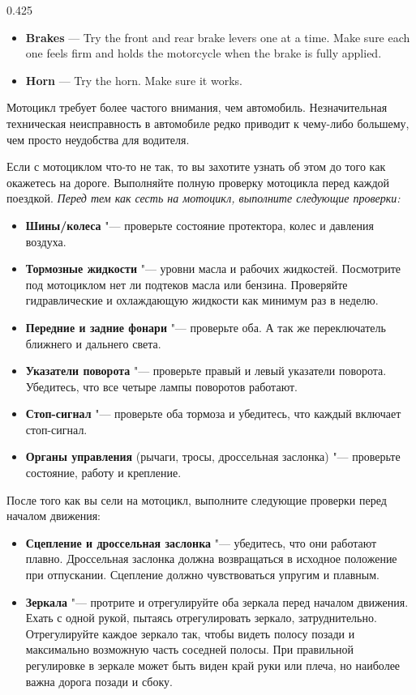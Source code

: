 \begin{langblock}{0.425}
\begin{eng}
\begin{itemize}
		\item \textbf{Brakes} --- Try the front and rear brake levers one at a time. Make sure each one feels firm and holds the motorcycle when the brake is fully applied.
		\item \textbf{Horn} --- Try the horn. Make sure it works.
	\end{itemize}
\end{eng}
\begin{rus}
		Мотоцикл требует более частого внимания, чем автомобиль. Незначительная техническая неисправность в автомобиле редко приводит к чему-либо большему, чем просто неудобства для водителя.
		
		Если с мотоциклом что-то не так, то вы захотите узнать об этом до того как окажетесь на дороге. Выполняйте полную проверку мотоцикла перед каждой поездкой.
		\newline\newline
		\textit{Перед тем как сесть на мотоцикл, выполните следующие проверки:}
		\begin{itemize}
			\item \textbf{Шины/колеса} "--- проверьте состояние протектора, колес и давления воздуха.
			\item \textbf{Тормозные жидкости} "--- уровни масла и рабочих жидкостей. Посмотрите под мотоциклом нет ли подтеков масла или бензина. Проверяйте гидравлические и охлаждающую жидкости как минимум раз в неделю. 
			\item \textbf{Передние и задние фонари} "--- проверьте оба. А так же переключатель ближнего и дальнего света.
			\item \textbf{Указатели поворота} "--- проверьте правый и левый указатели поворота. Убедитесь, что все четыре лампы поворотов работают.
			\item \textbf{Стоп-сигнал} "--- проверьте оба тормоза и убедитесь, что каждый включает стоп-сигнал.
			\item \textbf{Органы управления} (рычаги, тросы, дроссельная заслонка) "--- проверьте состояние, работу и крепление.
		\end{itemize}
		После того как вы сели на мотоцикл, выполните следующие проверки перед началом движения:
		\begin{itemize}
			\item \textbf{Сцепление и дроссельная заслонка} "--- убедитесь, что они работают плавно. Дроссельная заслонка должна возвращаться в исходное положение при отпускании. Сцепление должно чувствоваться упругим и плавным.
			\item \textbf{Зеркала} "--- протрите и отрегулируйте оба зеркала перед началом движения. Ехать с одной рукой, пытаясь отрегулировать зеркало, затруднительно. Отрегулируйте каждое зеркало так, чтобы видеть полосу позади и максимально возможную часть соседней полосы. При правильной регулировке в зеркале может быть виден край руки или плеча, но наиболее важна дорога позади и сбоку.

\end{itemize}
\end{rus}
\end{langblock}
